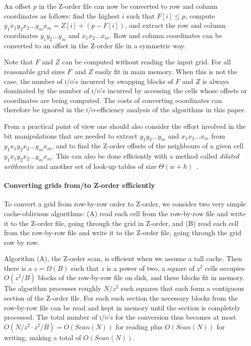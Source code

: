 \documentclass[10pt,a4paper]{article}
\def\io{\textsc{i/o}\xspace}
\def\ios{\textsc{i/o}'s\xspace}
\def\scan{\mathit{Scan}}
\begin{document}
An offset $p$ in the Z-order file can now be converted to row and column coordinates as follows: find the highest $i$ such that $F[i] \leq p$, compute $y_1x_1y_2x_2...y_mx_m = Z[i] + (p - F[i])$, and extract the row and column coordinates $y_1y_2...y_m$ and $x_1x_2...x_m$. Row and column coordinates can be converted to an offset in the Z-order file in a symmetric way.

Note that $F$ and $Z$ can be computed without reading the input grid. For all reasonable grid sizes $F$~and $Z$ easily fit in main memory. When this is not the case, the number of \ios incurred by swapping blocks of $F$ and $Z$ is always dominated by the number of \ios incurred by accessing the cells whose offsets or coordinates are being computed. The costs of converting coordinates can therefore be ignored in the \io-efficiency analysis of the algorithms in this paper.

From a practical point of view one should also consider the effort involved in the bit manipulations that are needed to extract $y_1y_2...y_m$ and $x_1x_2...x_m$ from $y_1x_1y_2x_2...y_mx_m$, and to find the Z-order offsets of the neighbours of a given cell $y_1x_1y_2x_2...y_mx_m$. This can also be done efficiently with a method called \emph{dilated arithmetic} and another set of look-up tables of size $\Theta(w + h)$~\cite{bitmanipulation}.

\paragraph{Converting grids from/to Z-order efficiently}
To convert a grid from row-by-row order to Z-order, we consider two very simple cache-oblivious algorithms: (A) read each cell from the row-by-row file and write it to the Z-order file, going through the grid in Z-order, and (B) read each cell from the row-by-row file and write it to the Z-order file, going through the grid row by row.

Algorithm (A), the Z-order scan, is efficient when we assume a tall cache. Then there is a $z = \Omega(B)$ such that $z$ is a power of two, a square of $z^2$ cells occupies $O(z^2/B)$ blocks of the row-by-row file on disk, and these blocks fit in memory.
The algorithm processes roughly $N / z^2$ such squares that each form a contiguous section of the Z-order file. For each such section the necessary blocks from the row-by-row file can be read and kept in memory until the section is completely processed. The total number of \ios for the conversion thus becomes at most $O(N/z^2 \cdot z^2/B) = O(\scan(N))$ for reading plus $O(\scan(N))$ for writing, making a total of $O(\scan(N))$.
\end{document}

